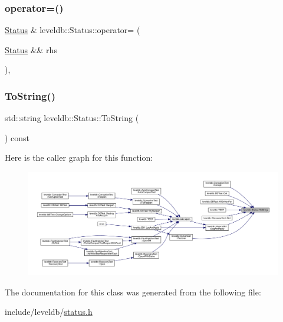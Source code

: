 \mbox{\label{classleveldb_1_1_status_a70ba77aa00b1c1c26aa2a59010723284}} 
\subsubsection{\texorpdfstring{operator=()}{operator=()}\hspace{0.1cm}{\footnotesize\ttfamily [2/2]}}
{\footnotesize\ttfamily \mbox{\hyperlink{classleveldb_1_1_status}{Status}} \& leveldb\+::\+Status\+::operator= (\begin{DoxyParamCaption}\item[{\mbox{\hyperlink{classleveldb_1_1_status}{Status}} \&\&}]{rhs }\end{DoxyParamCaption})\hspace{0.3cm}{\ttfamily [inline]}, {\ttfamily [noexcept]}}

\mbox{\label{classleveldb_1_1_status_a9bd26a7abfa28b572a4f38732bf9218a}} 
\subsubsection{\texorpdfstring{ToString()}{ToString()}}
{\footnotesize\ttfamily std\+::string leveldb\+::\+Status\+::\+To\+String (\begin{DoxyParamCaption}{ }\end{DoxyParamCaption}) const}

Here is the caller graph for this function\+:
\nopagebreak
\begin{figure}[H]
\begin{center}
\leavevmode
\includegraphics[width=350pt]{classleveldb_1_1_status_a9bd26a7abfa28b572a4f38732bf9218a_icgraph}
\end{center}
\end{figure}


The documentation for this class was generated from the following file\+:\begin{DoxyCompactItemize}
\item 
include/leveldb/\mbox{\hyperlink{status_8h}{status.\+h}}\end{DoxyCompactItemize}
